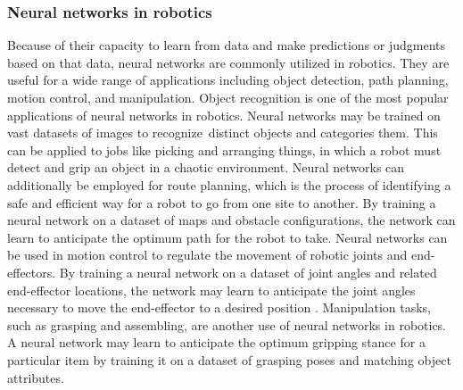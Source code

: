 \documentclass[12pt,oneside]{article}
\begin{document}
\subsubsection{Neural networks in robotics}
Because of their capacity to learn from data and make predictions or judgments based on that data, neural networks are commonly utilized in robotics. They are useful for a wide range of applications including object detection, path planning, motion control, and manipulation. 
Object recognition is one of the most popular applications of neural networks in robotics. Neural networks may be trained on vast datasets of images to recognize distinct objects and categories them. This can be applied to jobs like picking and arranging things, in which a robot must detect and grip an object in a chaotic environment.
Neural networks can additionally be employed for route planning, which is the process of identifying a safe and efficient way for a robot to go from one site to another. By training a neural network on a dataset of maps and obstacle configurations, the network can learn to anticipate the optimum path for the robot to take.
Neural networks can be used in motion control to regulate the movement of robotic joints and end-effectors. By training a neural network on a dataset of joint angles and related end-effector locations, the network may learn to anticipate the joint angles necessary to move the end-effector to a desired position \cite{44_villegas2018neural}.
Manipulation tasks, such as grasping and assembling, are another use of neural networks in robotics. A neural network may learn to anticipate the optimum gripping stance for a particular item by training it on a dataset of grasping poses and matching object attributes.
\end{document}

